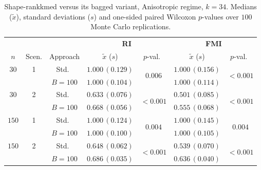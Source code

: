 \begin{table}[h]
\centering
\caption{Shape-rankkmed versus its bagged variant, Anisotropic regime, $k=34$. Medians ($\tilde x$), standard deviations ($s$) and one-sided paired Wilcoxon $p$-values over $100$ Monte Carlo replications.}
\label{tab:rkm-aniso-k34}
\footnotesize
\begin{tabular}{cc c cc cc}
\toprule
& & & \multicolumn{2}{c}{\textbf{RI}} & \multicolumn{2}{c}{\textbf{FMI}} \\
\cmidrule(lr){4-5}\cmidrule(lr){6-7}
$n$ & Scen. & Approach & $\tilde x$ ($s$) & $p$-val.\ & $\tilde x$ ($s$) & $p$-val.\ \\
\midrule
$30$ & 1 & Std.\ & $1.000\,(0.129)$ & \multirow{2}{*}{$\mathbf{0.006}$} & $1.000\,(0.156)$ & \multirow{2}{*}{$\mathbf{<\!0.001}$} \\
     &   & $B{=}100$ & $1.000\,(0.104)$ & & $1.000\,(0.114)$ & \\
$30$ & 2 & Std.\ & $0.633\,(0.076)$ & \multirow{2}{*}{$\mathbf{<\!0.001}$} & $0.501\,(0.085)$ & \multirow{2}{*}{$\mathbf{<\!0.001}$} \\
     &   & $B{=}100$ & $0.668\,(0.056)$ & & $0.555\,(0.068)$ & \\
$150$ & 1 & Std.\ & $1.000\,(0.124)$ & \multirow{2}{*}{$\mathbf{0.004}$} & $1.000\,(0.145)$ & \multirow{2}{*}{$\mathbf{0.004}$} \\
     &   & $B{=}100$ & $1.000\,(0.100)$ & & $1.000\,(0.105)$ & \\
$150$ & 2 & Std.\ & $0.648\,(0.062)$ & \multirow{2}{*}{$\mathbf{<\!0.001}$} & $0.539\,(0.070)$ & \multirow{2}{*}{$\mathbf{<\!0.001}$} \\
     &   & $B{=}100$ & $0.686\,(0.035)$ & & $0.636\,(0.040)$ & \\
\bottomrule
\end{tabular}
\end{table}

